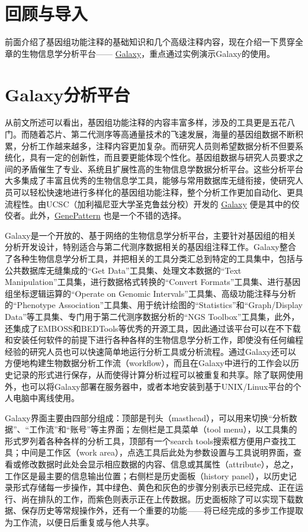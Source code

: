 \documentclass[11pt,a4paper,twoside]{book}
\begin{document}
\section{回顾与导入}
前面介绍了基因组功能注释的基础知识和几个高级注释内容，现在介绍一下贯穿全章的生物信息学分析平台—— \href{http://galaxyproject.org}{Galaxy}，重点通过实例演示Galaxy的使用。

\section{Galaxy分析平台}
从前文所述可以看出，基因组功能注释的内容丰富多样，涉及的工具更是五花八门。而随着芯片、第二代测序等高通量技术的飞速发展，海量的基因组数据不断积累，分析工作越来越多，注释内容更加复杂。而研究人员则希望数据分析不但要系统化，具有一定的创新性，而且要更能体现个性化。基因组数据与研究人员要求之间的矛盾催生了专业、系统且扩展性高的生物信息学数据分析平台。这些分析平台大多集成了丰富且优秀的生物信息学工具，能够与常用数据库无缝衔接，使研究人员可以轻松快速地进行多样化的基因组功能注释，整个分析工作更加自动化、更具流程性。由UCSC（加利福尼亚大学圣克鲁兹分校）开发的 \href{https://main.g2.bx.psu.edu/}{Galaxy} 便是其中的佼佼者。此外，\href{http://www.broadinstitute.org/cancer/software/genepattern/}{GenePattern} 也是一个不错的选择。

Galaxy是一个开放的、基于网络的生物信息学分析平台，主要针对基因组的相关分析开发设计，特别适合与第二代测序数据相关的基因组注释工作。Galaxy整合了各种生物信息学分析工具，并把相关的工具分类汇总到特定的工具集中，包括与公共数据库无缝集成的“Get Data”工具集、处理文本数据的“Text Manipulation”工具集，进行数据格式转换的“Convert Formats”工具集、进行基因组坐标逻辑运算的“Operate on Genomic Intervals”工具集、高级功能注释与分析的“Phenotype Association”工具集、用于统计绘图的“Statistics”和“Graph/Display Data”等工具集、专门用于第二代测序数据分析的“NGS Toolbox”工具集，此外，还集成了EMBOSS和BEDTools等优秀的开源工具，因此通过该平台可以在不下载和安装任何软件的前提下进行各种各样的生物信息学分析工作，即使没有任何编程经验的研究人员也可以快速简单地运行分析工具或分析流程。通过Galaxy还可以方便地构建生物数据分析工作流（workflow），而且在Galaxy中进行的工作会以历史记录的形式进行保存，从而使得计算分析过程可以被重复和共享。除了联网使用外，也可以将Galaxy部署在服务器中，或者本地安装到基于UNIX/Linux平台的个人电脑中离线使用。

Galaxy界面主要由四部分组成：顶部是刊头（masthead），可以用来切换“分析数据”、“工作流”和“账号”等主界面；左侧栏是工具菜单（tool menu），以工具集的形式罗列着各种各样的分析工具，顶部有一个search tools搜索框方便用户查找工具；中间是工作区（work area），点选工具后此处为参数设置与工具说明界面，查看或修改数据时此处会显示相应数据的内容、信息或其属性（attribute），总之，工作区是最主要的信息输出位置；右侧栏是历史面板（history panel），以历史记录形式存储每一步操作，其中绿色、黄色和灰色的步骤分别表示已经完成、正在运行、尚在排队的工作，而紫色则表示正在上传数据。历史面板除了可以实现下载数据、保存历史等常规操作外，还有一个重要的功能——将已经完成的多步工作提取为工作流，以便日后重复或与他人共享。
\end{document}
